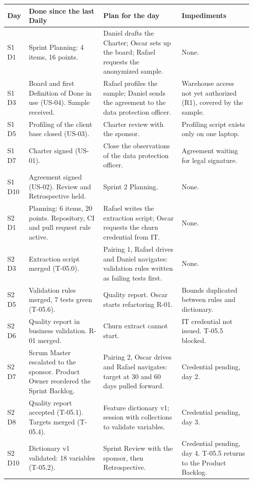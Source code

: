\documentclass[10pt,a4paper]{article}
\begin{document}
{\footnotesize
\begin{tabularx}{\linewidth}{@{}l L L L@{}}
\toprule
Day & Done since the last Daily & Plan for the day & Impediments \\
\midrule
S1 D1 & Sprint Planning: 4 items, 16 points. & Daniel drafts the Charter; Oscar sets up the board; Rafael requests the anonymized sample. & None. \\
S1 D3 & Board and first Definition of Done in use (US-04). Sample received. & Rafael profiles the sample; Daniel sends the agreement to the data protection officer. & Warehouse access not yet authorized (R1), covered by the sample. \\
S1 D5 & Profiling of the client base closed (US-03). & Charter review with the sponsor. & Profiling script exists only on one laptop. \\
S1 D7 & Charter signed (US-01). & Close the observations of the data protection officer. & Agreement waiting for legal signature. \\
S1 D10 & Agreement signed (US-02). Review and Retrospective held. & Sprint 2 Planning. & None. \\
\midrule
S2 D1 & Planning: 6 items, 20 points. Repository, CI and pull request rule active. & Rafael writes the extraction script; Oscar requests the churn credential from IT. & None. \\
S2 D3 & Extraction script merged (T-05.0). & Pairing 1, Rafael drives and Daniel navigates: validation rules written as failing tests first. & None. \\
S2 D5 & Validation rules merged, 7 tests green (T-05.6). & Quality report. Oscar starts refactoring R-01. & Bounds duplicated between rules and dictionary. \\
S2 D6 & Quality report in business validation. R-01 merged. & Churn extract cannot start. & \textcolor{alert}{IT credential not issued. T-05.5 blocked.} \\
S2 D7 & Scrum Master escalated to the sponsor. Product Owner reordered the Sprint Backlog. & Pairing 2, Oscar drives and Rafael navigates: target at 30 and 60 days pulled forward. & Credential pending, day 2. \\
S2 D8 & Quality report accepted (T-05.1). Targets merged (T-05.4). & Feature dictionary v1; session with collections to validate variables. & Credential pending, day 3. \\
S2 D10 & Dictionary v1 validated: 18 variables (T-05.2). & Sprint Review with the sponsor, then Retrospective. & Credential pending, day 4. T-05.5 returns to the Product Backlog. \\
\bottomrule
\end{tabularx}}
\end{document}
